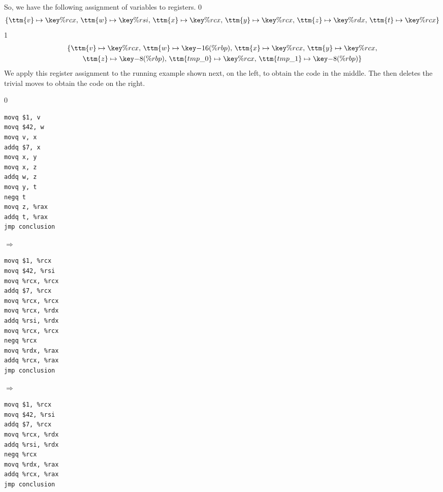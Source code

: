 \documentclass[7x10]{TimesAPriori_MIT}%
\def\racketEd{0}
\def\pythonEd{1}
\def\edition{0}
\numberwithin{theorem}{chapter}
\numberwithin{definition}{chapter}
\numberwithin{equation}{chapter}
\begin{document}
So, we have the following assignment of variables to registers.
{\if\edition\racketEd
\begin{gather*}
  \{ \ttm{v} \mapsto \key{\%rcx}, \,
     \ttm{w} \mapsto \key{\%rsi}, \,
     \ttm{x} \mapsto \key{\%rcx}, \,
     \ttm{y} \mapsto \key{\%rcx}, \,
     \ttm{z} \mapsto \key{\%rdx}, \,
     \ttm{t} \mapsto \key{\%rcx} \}
\end{gather*}
\fi}
{\if\edition\pythonEd
\begin{gather*}
  \{ \ttm{v} \mapsto \key{\%rcx}, \,
     \ttm{w} \mapsto \key{-16(\%rbp)}, \,
     \ttm{x} \mapsto \key{\%rcx}, \,
     \ttm{y} \mapsto \key{\%rcx}, \\
     \ttm{z} \mapsto \key{-8(\%rbp)}, \,
     \ttm{tmp\_0} \mapsto \key{\%rcx}, \,
     \ttm{tmp\_1} \mapsto \key{-8(\%rbp)} \}
\end{gather*}
\fi}
%
We apply this register assignment to the running example shown next,
on the left, to obtain the code in the middle.  The
 then deletes the trivial moves to obtain
the code on the right.

{\if\edition\racketEd
\begin{minipage}{0.25\textwidth}
\begin{lstlisting}
movq $1, v
movq $42, w
movq v, x
addq $7, x
movq x, y
movq x, z
addq w, z
movq y, t
negq t
movq z, %rax
addq t, %rax
jmp conclusion
\end{lstlisting}
\end{minipage}
$\Rightarrow\qquad$
\begin{minipage}{0.25\textwidth}
\begin{lstlisting}
movq $1, %rcx
movq $42, %rsi
movq %rcx, %rcx
addq $7, %rcx
movq %rcx, %rcx
movq %rcx, %rdx
addq %rsi, %rdx
movq %rcx, %rcx
negq %rcx
movq %rdx, %rax
addq %rcx, %rax
jmp conclusion
\end{lstlisting}
\end{minipage}
$\Rightarrow\qquad$
\begin{minipage}{0.25\textwidth}
\begin{lstlisting}
movq $1, %rcx
movq $42, %rsi
addq $7, %rcx
movq %rcx, %rdx
addq %rsi, %rdx
negq %rcx
movq %rdx, %rax
addq %rcx, %rax
jmp conclusion
\end{lstlisting}
\end{minipage}
\fi}
\end{document}
